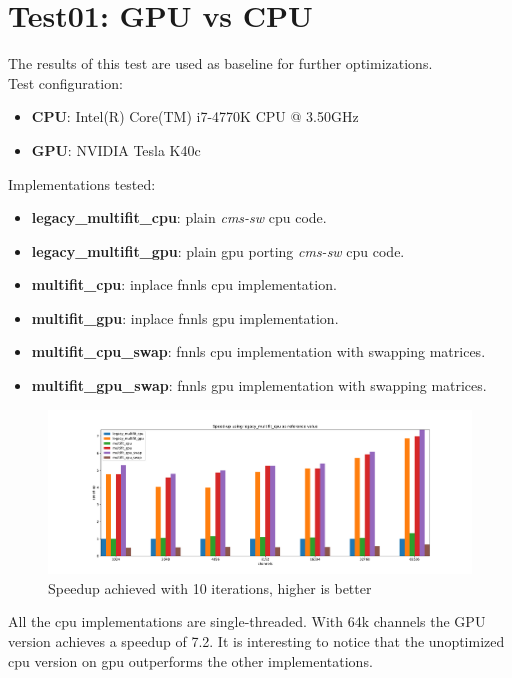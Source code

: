 \section{Test01: GPU vs CPU}
The results of this test are used as baseline for further optimizations. \\
Test configuration:
\begin{itemize}
  \item \textbf{CPU}: Intel(R) Core(TM) i7-4770K CPU @ 3.50GHz 
  \item \textbf{GPU}: NVIDIA Tesla K40c 
\end{itemize}
Implementations tested:
\begin{itemize}
  \item \textbf{legacy\_multifit\_cpu}: plain \textit{cms-sw} cpu code.
  \item \textbf{legacy\_multifit\_gpu}: plain gpu porting \textit{cms-sw} cpu code.
  \item \textbf{multifit\_cpu}: inplace fnnls cpu implementation.
  \item \textbf{multifit\_gpu}: inplace fnnls gpu implementation.
  \item \textbf{multifit\_cpu\_swap}: fnnls cpu implementation with swapping matrices.
  \item \textbf{multifit\_gpu\_swap}: fnnls gpu implementation with swapping matrices.
\end{itemize}
\begin{figure}[h]
  \includegraphics[width=\textwidth]{img/speedup}
  \caption{Speedup achieved with 10 iterations, higher is better}
  \label{img:speedup01}
\end{figure}
All the cpu implementations are single-threaded. With 64k channels the GPU version achieves a speedup of 7.2. It is interesting to notice that the unoptimized cpu version on gpu outperforms the other implementations.
